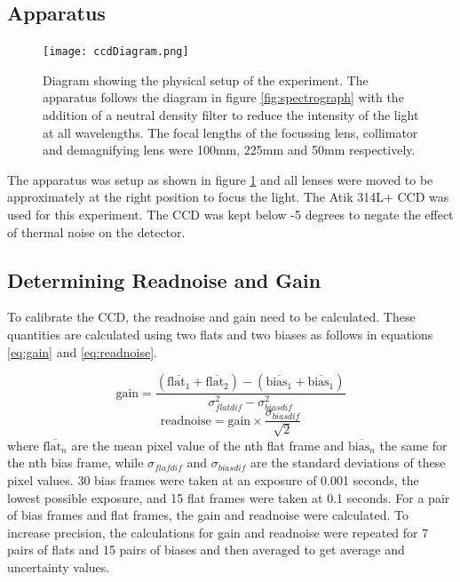\documentclass[a4paper,12pt,twocolumn]{article}
\let\cite=\supercite
\begin{document}
		\subsection{Apparatus}
			\begin{figure}
				\texttt{[image: ccdDiagram.png]}
				\captionsetup{font=scriptsize}
				\caption{Diagram showing the physical setup of the experiment\cite{manual}. The apparatus follows the diagram in figure \ref{fig:spectrograph} with the addition of a neutral density filter to reduce the intensity of the light at all wavelengths. The focal lengths of the focussing lens, collimator and demagnifying lens were 100mm, 225mm and 50mm respectively.}
				\label{fig:apparatus}
			\end{figure}
		
			The apparatus was setup as shown in figure \ref{fig:apparatus} and all lenses were moved to be approximately at the right position to focus the light. The Atik 314L+ CCD was used for this experiment. The CCD was kept below -5 degrees to negate the effect of thermal noise on the detector.
	
		\subsection{Determining Readnoise and Gain}
			To calibrate the CCD, the readnoise and gain need to be calculated. These quantities are calculated using two flats and two biases as follows in equations \ref{eq:gain} and \ref{eq:readnoise}\cite{manual}.
			
			\begin{equation}
				\text{gain} = \frac{(\overline{\text{flat}_1} + \overline{\text{flat}_2}) - (\overline{\text{bias}_1} + \overline{\text{bias}_1})}{\sigma_{flatdif}^2 - \sigma_{biasdif}^2}
				\label{eq:gain}
			\end{equation}
			\begin{equation}
				\text{readnoise} = \text{gain} \times \frac{\sigma_{biasdif}}{\sqrt{2}}
				\label{eq:readnoise}
			\end{equation} where $\overline{\text{flat}_n}$ are the mean pixel value of the nth flat frame and $\overline{\text{bias}_n}$ the same for the nth bias frame, while $\sigma_{flafdif}$ and $\sigma_{biasdif}$ are the standard deviations of these pixel values. 30 bias frames were taken at an exposure of 0.001 seconds, the lowest possible exposure, and 15 flat frames were taken at 	0.1 seconds. For a pair of bias frames and flat frames, the gain and readnoise were calculated. To increase precision, the calculations for gain and readnoise were repeated for 7 pairs of flats and 15 pairs of biases and then averaged to get average and uncertainty values.
		
\end{document}
